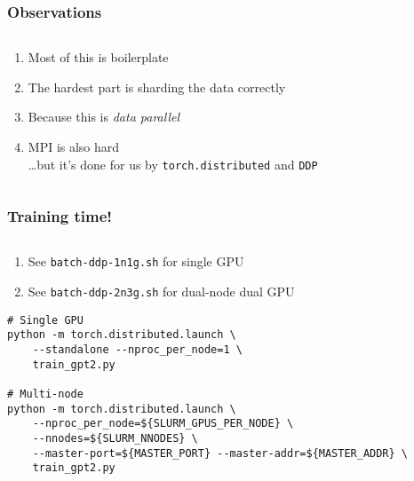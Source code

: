 \documentclass[
	notes=none,
	aspectratio=169
]{beamer}
\begin{document}

\begin{frame}
\frametitle{Observations}

\begin{columns}[T]
\begin{column}[T]{1.0\textwidth}
\setlength{\parskip}{0.5em}

\vspace{0.0cm}
\begin{enumerate}
\setlength{\parskip}{0.5em}
\item Most of this is boilerplate
\item The hardest part is sharding the data correctly
\item Because this is {\it data parallel}
\item MPI is also hard \\ \vspace{0.5em} \qquad \qquad \ldots but it's done for us by {\tt torch.distributed} and {\tt DDP}
\end{enumerate}

\end{column}
\end{columns}

\end{frame}
\note{
}


\begin{frame}[fragile]
\frametitle{Training time!}

\begin{columns}[T]
\begin{column}[T]{1.0\textwidth}
\setlength{\parskip}{0.5em}

\vspace{0.0cm}
\begin{enumerate}
\setlength{\parskip}{0.5em}
\item See {\tt batch-ddp-1n1g.sh} for single GPU
\item See {\tt batch-ddp-2n3g.sh} for dual-node dual GPU
\end{enumerate}

\begin{lstlisting}[backgroundcolor = \color{darkgray},language=shell]
# Single GPU
python -m torch.distributed.launch \
    --standalone --nproc_per_node=1 \
    train_gpt2.py

# Multi-node
python -m torch.distributed.launch \
    --nproc_per_node=${SLURM_GPUS_PER_NODE} \
    --nnodes=${SLURM_NNODES} \
    --master-port=${MASTER_PORT} --master-addr=${MASTER_ADDR} \
    train_gpt2.py
\end{lstlisting}

\end{column}
\end{columns}

\end{frame}
\note{
}
\end{document}
